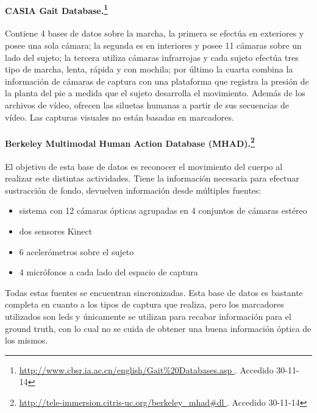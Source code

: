 \paragraph{CASIA Gait Database.\footnote{ \textcolor{blue}{\underline{\url{http://www.cbsr.ia.ac.cn/english/Gait\%20Databases.asp
 }}}. Accedido 30-11-14}} 
Contiene 4 bases de datos sobre la marcha, la primera se efectúa en exteriores y posee una sola cámara; la segunda es en interiores  y posee 11 cámaras sobre un lado del sujeto; la tercera utiliza cámaras infrarrojas y cada sujeto efectúa tres tipo de marcha, lenta, rápida y con mochila; por último la cuarta combina la información de cámaras de captura con una plataforma que registra la presión de la planta del pie a medida que el sujeto desarrolla el movimiento. Además de los archivos de vídeo, ofrecen las siluetas humanas a partir de sus secuencias de vídeo. Las capturas visuales no están basadas en marcadores.

\paragraph{Berkeley Multimodal Human Action Database (MHAD).\footnote{\textcolor{blue}{\underline{\url{http://tele-immersion.citris-uc.org/berkeley_mhad\#dl  }}}. Accedido 30-11-14}}
El objetivo de esta base de datos es reconocer el movimiento del cuerpo al realizar este distintas actividades. Tiene la información necesaria para efectuar sustracción de fondo, devuelven información desde múltiples fuentes:
\begin{itemize}
\item sistema con 12 cámaras ópticas agrupadas en 4 conjuntos de cámaras estéreo
\item dos sensores Kinect
\item 6 acelerómetros sobre el sujeto
\item 4 micrófonos a cada lado del espacio de captura
\end{itemize} Todas estas fuentes se encuentran sincronizadas. Esta base de datos es bastante completa en cuanto a los tipos de captura que realiza, pero los marcadores utilizados son leds y únicamente se utilizan para recabar información para el ground truth, con lo cual no se cuida de obtener una buena información óptica de los mismos. 




